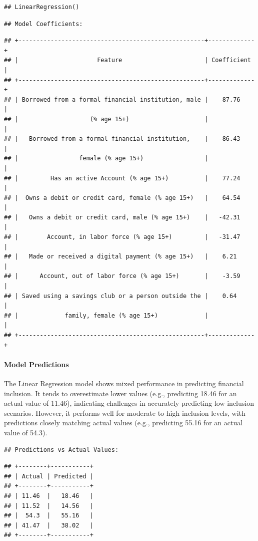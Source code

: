 \documentclass[preprint, 3p,
authoryear]{elsarticle} %
\begin{document}
\begin{verbatim}
## LinearRegression()
\end{verbatim}

\begin{verbatim}
## Model Coefficients:
\end{verbatim}

\begin{verbatim}
## +----------------------------------------------------+-------------+
## |                      Feature                       | Coefficient |
## +----------------------------------------------------+-------------+
## | Borrowed from a formal financial institution, male |    87.76    |
## |                    (% age 15+)                     |             |
## |   Borrowed from a formal financial institution,    |   -86.43    |
## |                 female (% age 15+)                 |             |
## |         Has an active Account (% age 15+)          |    77.24    |
## |  Owns a debit or credit card, female (% age 15+)   |    64.54    |
## |   Owns a debit or credit card, male (% age 15+)    |   -42.31    |
## |        Account, in labor force (% age 15+)         |   -31.47    |
## |   Made or received a digital payment (% age 15+)   |    6.21     |
## |      Account, out of labor force (% age 15+)       |    -3.59    |
## | Saved using a savings club or a person outside the |    0.64     |
## |             family, female (% age 15+)             |             |
## +----------------------------------------------------+-------------+
\end{verbatim}

\paragraph{Model Predictions}\label{model-predictions}

The Linear Regression model shows mixed performance in predicting
financial inclusion. It tends to overestimate lower values (e.g.,
predicting 18.46 for an actual value of 11.46), indicating challenges in
accurately predicting low-inclusion scenarios. However, it performs well
for moderate to high inclusion levels, with predictions closely matching
actual values (e.g., predicting 55.16 for an actual value of 54.3).

\begin{verbatim}
## Predictions vs Actual Values:
\end{verbatim}

\begin{verbatim}
## +--------+-----------+
## | Actual | Predicted |
## +--------+-----------+
## | 11.46  |   18.46   |
## | 11.52  |   14.56   |
## |  54.3  |   55.16   |
## | 41.47  |   38.02   |
## +--------+-----------+
\end{verbatim}
\end{document}
